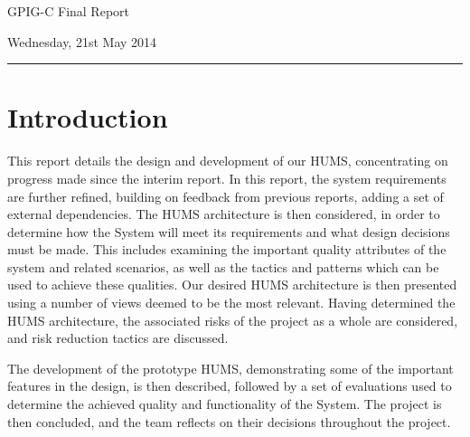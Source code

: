 \documentclass[10pt,a4paper]{article}
\begin{document}
\begin{center}
{\vspace*{-0.5cm}
\Huge GPIG-C Final Report}
\vspace*{0.2cm}

\vspace*{0.1cm}

Wednesday, 21st May 2014
\end{center}
\vspace*{0.4cm}
\hrule
\vspace*{0.4cm}

\section{Introduction}
\label{sec:intro}
This report details the design and development of our HUMS, concentrating on progress made since the interim report. In this report, the system requirements are further refined, building on feedback from previous reports, adding a set of external dependencies. The HUMS architecture is then considered, in order to determine how the System will meet its requirements and what design decisions must be made. This includes examining the important quality attributes of the system and related scenarios, as well as the tactics and patterns which can be used to achieve these qualities. Our desired HUMS architecture is then presented using a number of views deemed to be the most relevant. Having determined the HUMS architecture, the associated risks of the project as a whole are considered, and risk reduction tactics are discussed.

The development of the prototype HUMS, demonstrating some of the important features in the design, is then described, followed by a set of evaluations used to determine the achieved quality and functionality of the System. The project is then concluded, and the team reflects on their decisions throughout the project.

\end{document}
